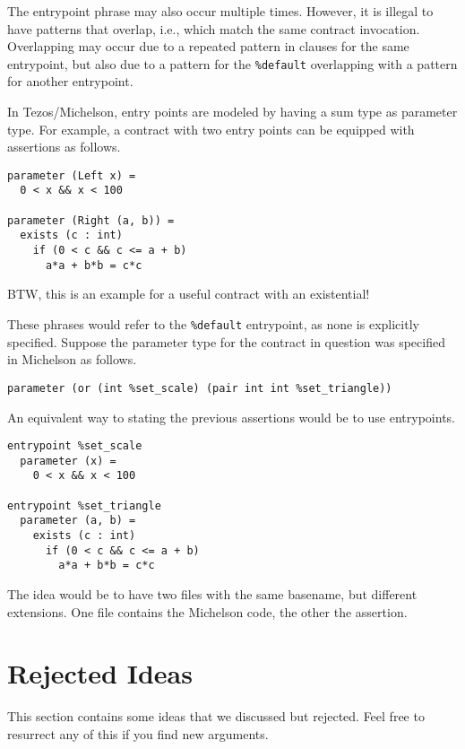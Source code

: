 \documentclass{article}
\begin{document}
The entrypoint phrase may also occur multiple times. However, it is
illegal to have patterns that overlap, i.e., which match the same
contract invocation. Overlapping may occur due to a repeated pattern
in clauses for the same entrypoint, but also due to a pattern for the
\lstinline/%default/ overlapping with a pattern for another entrypoint.

In Tezos/Michelson, entry points are
modeled by having a sum type as parameter type. For example, a
contract with two entry points can be equipped with assertions as
follows.
\begin{lstlisting}[language=caml]
parameter (Left x) =
  0 < x && x < 100

parameter (Right (a, b)) =
  exists (c : int)
    if (0 < c && c <= a + b)
      a*a + b*b = c*c
\end{lstlisting}
BTW, this is an example for a useful contract with an existential!

These phrases would refer to the \lstinline/%default/ entrypoint, as
none is explicitly specified. Suppose the parameter type for the
contract in question was specified in Michelson as follows.
\begin{lstlisting}
parameter (or (int %set_scale) (pair int int %set_triangle))
\end{lstlisting}
An equivalent way to stating the previous assertions would be to use
entrypoints.
\begin{lstlisting}[language=caml]
entrypoint %set_scale
  parameter (x) =
    0 < x && x < 100

entrypoint %set_triangle
  parameter (a, b) =
    exists (c : int)
      if (0 < c && c <= a + b)
        a*a + b*b = c*c
\end{lstlisting}

The idea would be to have two files with the same basename, but
different extensions. One file contains the Michelson code, the other
the assertion.

\section{Rejected Ideas}
\label{sec:rejected-ideas}

This section contains some ideas that we discussed but rejected. Feel free to resurrect
any of this if you find new arguments.
\end{document}
